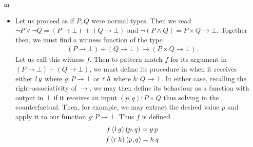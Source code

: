 \documentclass[11pt]{article}
\begin{document}
\begin{my proof}{m}
\begin{itemize}

\item Let us proceed as if $P,Q$ were normal types. Then we read $\neg P \vee \neg Q = (P \to \bot) + (Q \to \bot)$ and $\neg (P \wedge Q) = P \times Q \to \bot$. Together then, we must find a witness function of the type
\begin{align*}
(P \to \bot) + (Q \to \bot) \to (P \times Q \to \bot).
\end{align*}
Let us call this witness $f$. Then to pattern match $f$ for its argument in $(P \to \bot) + (Q \to \bot)$, we must define its procedure in when it receives either $l \hspace{0.2em} g$ where $g \colon P \to \bot$ or  $r \hspace{0.2em} h$ where $h \colon Q \to \bot$. In either case, recalling the right-associativity of $\to$, we may then define its behaviour as a function with output in $\bot$ if it receives an input $(p,q) \colon P \times Q$ thus solving in the counterfactual. Then, for example, we may extract the desired value $p$ and apply it to our function $g \colon P \to \bot$. Thus $f$ is defined \begin{gather*}
f \hspace{0.2em} (l \hspace{0.2em} g) \hspace{0.2em} (p,q) = g \hspace{0.2em} p \\
f \hspace{0.2em} (r \hspace{0.2em} h) \hspace{0.2em} (p,q) = h \hspace{0.2em} q
\end{gather*}



\end{itemize}
\end{my proof}
\end{document}
